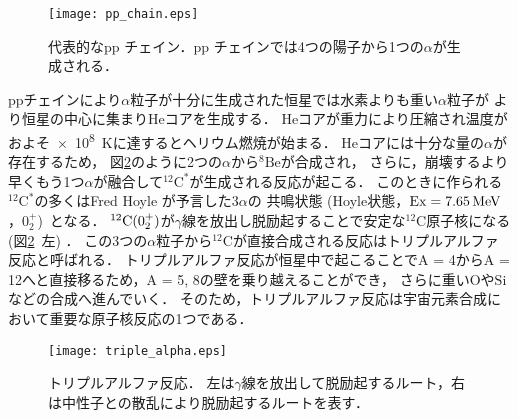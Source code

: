 \documentclass[../master]{subfiles}
\begin{document}
\begin{figure}
  \centering
  \texttt{[image: pp\_chain.eps]}
  \caption{代表的なpp チェイン．pp チェインでは4つの陽子から1つの$\alpha$が生成される．}
  \label{fig::pp_chain}
\end{figure}

ppチェインにより$\alpha$粒子が十分に生成された恒星では水素よりも重い$\alpha$粒子が
より恒星の中心に集まり$\mathrm{He}$コアを生成する．
$\mathrm{He}$コアが重力により圧縮され温度がおよそ\SI{e8}{\kelvin}に達するとヘリウム燃焼が始まる．
$\mathrm{He}$コアには十分な量の$\alpha$が存在するため，
図\ref{fig::triple_alpha}のように2つの$\alpha$から${}^{8}\mathrm{Be}$が合成され，
さらに，崩壊するより早くもう1つ$\alpha$が融合して${}^{12}\mathrm{C}^{*}$が生成される反応が起こる．
このときに作られる${}^{12}\mathrm{C}^{*}$の多くはFred Hoyle が予言した$3\alpha$の
共鳴状態 (Hoyle状態，${\rm Ex} = \SI{7.65}{\mega\electronvolt}$，$0_{2}^{+}$)~\cite{hoyle_state}となる．
${}^{12}{\rm C} (0_2^+)$が$\gamma$線を放出し脱励起することで安定な${}^{12}\mathrm{C}$原子核になる
 (図\ref{fig::triple_alpha}~左) ．
この3つの$\alpha$粒子から${}^{12}\mathrm{C}$が直接合成される反応はトリプルアルファ反応と呼ばれる．
トリプルアルファ反応が恒星中で起こることでA = 4からA = 12へと直接移るため，A = 5, 8の壁を乗り越えることができ，
さらに重い$\mathrm{O}$や$\mathrm{Si}$などの合成へ進んでいく．
そのため，トリプルアルファ反応は宇宙元素合成において重要な原子核反応の1つである．
\begin{figure}
  \centering
  \texttt{[image: triple\_alpha.eps]}
  \caption[トリプルアルファ反応．]{トリプルアルファ反応．
    左は$\gamma$線を放出して脱励起するルート，右は中性子との散乱により脱励起するルートを表す．}
  \label{fig::triple_alpha}
\end{figure}
\end{document}
